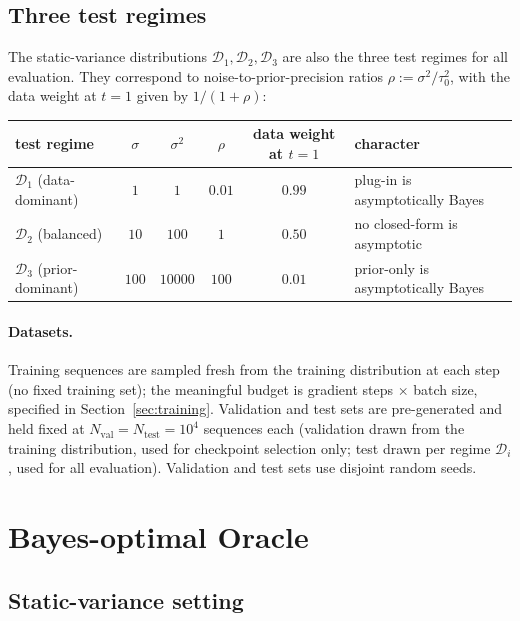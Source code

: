 \documentclass[11pt]{article}
\begin{document}
\subsection{Three test regimes}
\label{sec:regimes}

The static-variance distributions $\mathcal{D}_1, \mathcal{D}_2, \mathcal{D}_3$ are also the three test regimes for all evaluation. They correspond to noise-to-prior-precision ratios $\rho := \sigma^2/\tau_0^2$, with the data weight at $t = 1$ given by $1/(1 + \rho)$:

\begin{center}
\small
\begin{tabular}{l c c c c l}
\hline
test regime & $\sigma$ & $\sigma^2$ & $\rho$ & data weight at $t = 1$ & character \\
\hline
$\mathcal{D}_1$ (data-dominant)    & $1$   & $1$     & $0.01$ & $0.99$ & plug-in is asymptotically Bayes \\
$\mathcal{D}_2$ (balanced)         & $10$  & $100$   & $1$    & $0.50$ & no closed-form is asymptotic \\
$\mathcal{D}_3$ (prior-dominant)   & $100$ & $10000$ & $100$  & $0.01$ & prior-only is asymptotically Bayes \\
\hline
\end{tabular}
\end{center}

\paragraph{Datasets.} Training sequences are sampled fresh from the training distribution at each step (no fixed training set); the meaningful budget is gradient steps $\times$ batch size, specified in Section~\ref{sec:training}. Validation and test sets are pre-generated and held fixed at $N_{\mathrm{val}} = N_{\mathrm{test}} = 10^4$ sequences each (validation drawn from the training distribution, used for checkpoint selection only; test drawn per regime $\mathcal{D}_i$, used for all evaluation). Validation and test sets use disjoint random seeds.

\section{Bayes-optimal Oracle}
\label{sec:oracle}

\subsection{Static-variance setting}
\label{sec:oracle-static}
\end{document}
